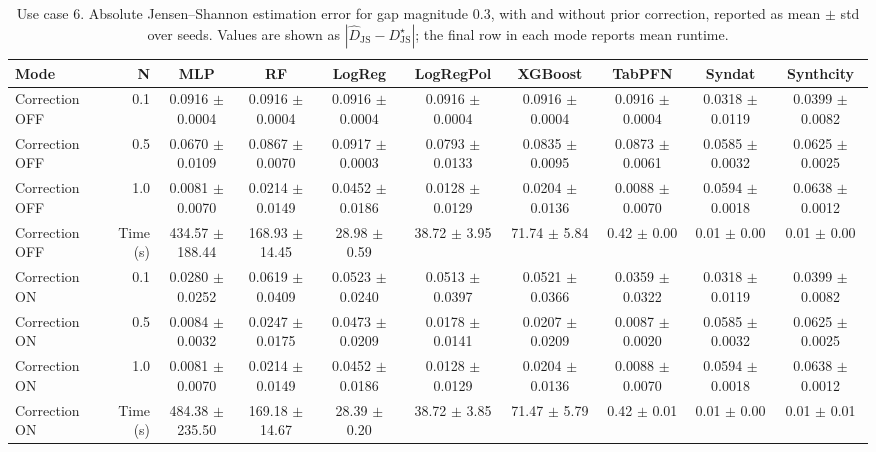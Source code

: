 \begin{table}[ht]
\centering
\scriptsize
\setlength{\tabcolsep}{2.5pt}
\caption{Use case 6. Absolute Jensen--Shannon estimation error for gap magnitude $0.3$, with and without prior correction, reported as mean $\pm$ std over seeds. Values are shown as $|\widehat{D}_{\mathrm{JS}} - D_{\mathrm{JS}}^{\star}|$; the final row in each mode reports mean runtime.}
\label{tab:uc6_gap_0p3_on_off_mean_std_from_seeds}
\begin{tabular}{lrcccccccc}
\toprule
Mode & N & MLP & RF & LogReg & LogRegPol & XGBoost & TabPFN & Syndat & Synthcity \\
\midrule
Correction OFF & 0.1 & 0.0916 $\pm$ 0.0004 & 0.0916 $\pm$ 0.0004 & 0.0916 $\pm$ 0.0004 & 0.0916 $\pm$ 0.0004 & 0.0916 $\pm$ 0.0004 & 0.0916 $\pm$ 0.0004 & 0.0318 $\pm$ 0.0119 & 0.0399 $\pm$ 0.0082 \\
Correction OFF & 0.5 & 0.0670 $\pm$ 0.0109 & 0.0867 $\pm$ 0.0070 & 0.0917 $\pm$ 0.0003 & 0.0793 $\pm$ 0.0133 & 0.0835 $\pm$ 0.0095 & 0.0873 $\pm$ 0.0061 & 0.0585 $\pm$ 0.0032 & 0.0625 $\pm$ 0.0025 \\
Correction OFF & 1.0 & 0.0081 $\pm$ 0.0070 & 0.0214 $\pm$ 0.0149 & 0.0452 $\pm$ 0.0186 & 0.0128 $\pm$ 0.0129 & 0.0204 $\pm$ 0.0136 & 0.0088 $\pm$ 0.0070 & 0.0594 $\pm$ 0.0018 & 0.0638 $\pm$ 0.0012 \\
Correction OFF & Time (s) & 434.57 $\pm$ 188.44 & 168.93 $\pm$ 14.45 & 28.98 $\pm$ 0.59 & 38.72 $\pm$ 3.95 & 71.74 $\pm$ 5.84 & 0.42 $\pm$ 0.00 & 0.01 $\pm$ 0.00 & 0.01 $\pm$ 0.00 \\
Correction ON & 0.1 & 0.0280 $\pm$ 0.0252 & 0.0619 $\pm$ 0.0409 & 0.0523 $\pm$ 0.0240 & 0.0513 $\pm$ 0.0397 & 0.0521 $\pm$ 0.0366 & 0.0359 $\pm$ 0.0322 & 0.0318 $\pm$ 0.0119 & 0.0399 $\pm$ 0.0082 \\
Correction ON & 0.5 & 0.0084 $\pm$ 0.0032 & 0.0247 $\pm$ 0.0175 & 0.0473 $\pm$ 0.0209 & 0.0178 $\pm$ 0.0141 & 0.0207 $\pm$ 0.0209 & 0.0087 $\pm$ 0.0020 & 0.0585 $\pm$ 0.0032 & 0.0625 $\pm$ 0.0025 \\
Correction ON & 1.0 & 0.0081 $\pm$ 0.0070 & 0.0214 $\pm$ 0.0149 & 0.0452 $\pm$ 0.0186 & 0.0128 $\pm$ 0.0129 & 0.0204 $\pm$ 0.0136 & 0.0088 $\pm$ 0.0070 & 0.0594 $\pm$ 0.0018 & 0.0638 $\pm$ 0.0012 \\
Correction ON & Time (s) & 484.38 $\pm$ 235.50 & 169.18 $\pm$ 14.67 & 28.39 $\pm$ 0.20 & 38.72 $\pm$ 3.85 & 71.47 $\pm$ 5.79 & 0.42 $\pm$ 0.01 & 0.01 $\pm$ 0.00 & 0.01 $\pm$ 0.01 \\
\bottomrule
\end{tabular}
\end{table}